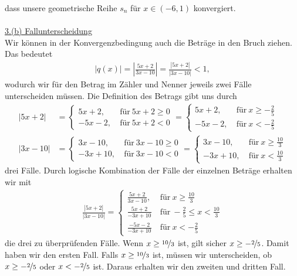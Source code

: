 dass unsere geometrische Reihe $s_n$ für $x \in (-6,1)$ konvergiert.
\\
\\
\underline{3.(b) Fallunterscheidung}\\
Wir können in der Konvergenzbedingung auch die Beträge in den Bruch ziehen.
Das bedeutet
\begin{align*}
|q(x)| =\left| \frac{5x+2}{3x-10} \right| =\frac{|5x+2|}{|3x-10|} < 1,  
\end{align*}
wodurch wir für den Betrag im Zähler und Nenner jeweils zwei Fälle unterscheiden müssen.
Die Definition des Betrags gibt uns durch
\begin{align*}
|5x +2| 
&= 
\begin{cases}
 5x + 2, &\ \text{für} \ 5x +2 \geq 0\\
 -5x-2,  &\ \text{für} \ 5x +2 < 0
\end{cases}
=
\begin{cases}
 5x + 2, &\ \text{für} \ x \geq -\frac{2}{5}\\
 -5x-2,  &\ \text{für} \ x < -\frac{2}{5}
\end{cases}\\
|3x -10|
&=
\begin{cases}
 3x - 10, &\ \text{für} \ 3x - 10 \geq 0\\
 -3x+10,  &\ \text{für} \ 3x - 10 < 0
\end{cases}
=
\begin{cases}
 3x - 10, &\ \text{für} \ x \geq \frac{10}{3}\\
 -3x+10,  &\ \text{für} \ x< \frac{10}{3}
\end{cases}
\end{align*}
drei Fälle. Durch logische Kombination der Fälle der einzelnen Beträge erhalten wir mit 
\begin{align*}
\frac{|5x+2|}{|3x-10|} 
= 
\begin{cases}
\frac{5x+2}{3x-10}, &\ \text{für} \ x \geq \frac{10}{3}\\
\frac{5x+2}{-3x+10} &\ \text{für} \ -\frac{2}{5} \leq x < \frac{10}{3}\\
\frac{-5x-2}{-3x+10} &\ \text{für} \ x < -\frac{2}{5}
\end{cases}
\end{align*}
die drei zu überprüfenden Fälle.
Wenn $x \geq \nicefrac{10}{3}$ ist, gilt sicher $x \geq -\nicefrac{2}{5}$.
Damit haben wir den ersten Fall.
Falls $x \geq \nicefrac{10}{3}$ ist, müssen wir unterscheiden, ob 
$x \geq -\nicefrac{2}{5}$ oder $x < -\nicefrac{2}{5}$ ist.
Daraus erhalten wir den zweiten und dritten Fall.
